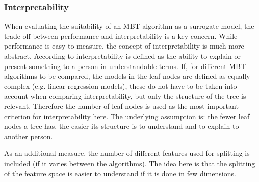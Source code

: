 \subsubsection{Interpretability}
When evaluating the suitability of an MBT algorithm as a surrogate model, the trade-off between performance and interpretability is a key concern. While performance is easy to measure, the concept of interpretability is much more abstract.
According to \citet{DoshiVelez.2017} interpretability is defined as the ability to explain or present something to a person in understandable terms. If, for different MBT algorithms to be compared, the models in the leaf nodes are defined as equally complex (e.g. linear regression models), these do not have to be taken into account when comparing interpretability, but only the structure of the tree is relevant. Therefore the number of leaf nodes is used as the most important criterion for interpretability here.  The underlying assumption is: the fewer leaf nodes a tree has, the easier its structure is to understand and to explain to another person.

As an additional measure, the number of different features used for splitting is included (if it varies between the algorithms). The idea here is that the splitting of the feature space is easier to understand if it is done in few dimensions.




